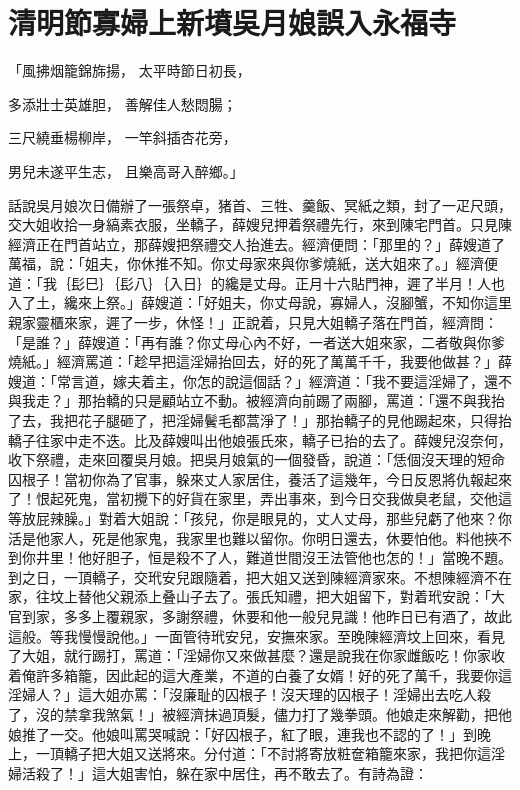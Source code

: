 %

\chapter{清明節寡婦上新墳\KG 吳月娘誤入永福寺}

「風拂烟籠錦旆揚，  太平時節日初長，

多添壯士英雄胆，  善解佳人愁悶腸；

三尺繞垂楊柳岸，  一竿斜插杏花旁，

男兒未遂平生志，  且樂高哥入醉鄉。」

話說吳月娘次日備辦了一張祭卓，猪首、三牲、羹飯、冥紙之類，封了一疋尺頭，交大姐收拾一身縞素衣服，坐轎子，薛嫂兒押着祭禮先行，來到陳宅門首。只見陳經濟正在門首站立，那薛嫂把祭禮交人抬進去。經濟便問：「那里的？」薛嫂道了萬福，說：「姐夫，你休推不知。你丈母家來與你爹燒紙，送大姐來了。」經濟便道：「我｛髟巳｝｛髟八｝｛入日｝的纔是丈母。正月十六貼門神，遲了半月！人也入了土，纔來上祭。」薛嫂道：「好姐夫，你丈母說，寡婦人，沒腳蟹，不知你這里親家靈櫃來家，遲了一步，休怪！」正說着，只見大姐轎子落在門首，經濟問：「是誰？」薛嫂道：「再有誰？你丈母心內不好，一者送大姐來家，二者敬與你爹燒紙。」經濟罵道：「趁早把這淫婦抬回去，好的死了萬萬千千，我要他做甚？」薛嫂道：「常言道，嫁夫着主，你怎的說這個話？」經濟道：「我不要這淫婦了，還不與我走？」那抬轎的只是顧站立不動。被經濟向前踢了兩腳，罵道：「還不與我抬了去，我把花子腿砸了，把淫婦鬢毛都蒿淨了！」那抬轎子的見他踢起來，只得抬轎子往家中走不迭。比及薛嫂叫出他娘張氏來，轎子已抬的去了。薛嫂兒沒奈何，收下祭禮，走來回覆吳月娘。把吳月娘氣的一個發昏，說道：「恁個沒天理的短命囚根子！當初你為了官事，躲來丈人家居住，養活了這幾年，今日反恩將仇報起來了！恨起死鬼，當初攪下的好貨在家里，弄出事來，到今日交我做臭老鼠，交他這等放屁辣臊。」對着大姐說：「孩兒，你是眼見的，丈人丈母，那些兒虧了他來？你活是他家人，死是他家鬼，我家里也難以留你。你明日還去，休要怕他。料他挾不到你井里！他好胆子，恒是殺不了人，難道世間沒王法管他也怎的！」當晚不題。到之日，一頂轎子，交玳安兒跟隨着，把大姐又送到陳經濟家來。不想陳經濟不在家，往坟上替他父親添上叠山子去了。張氏知禮，把大姐留下，對着玳安說：「大官到家，多多上覆親家，多謝祭禮，休要和他一般兒見識！他昨日已有酒了，故此這般。等我慢慢說他。」一面管待玳安兒，安撫來家。至晚陳經濟坟上回來，看見了大姐，就行踢打，罵道：「淫婦你又來做甚麼？還是說我在你家雌飯吃！你家收着俺許多箱籠，因此起的這大產業，不道的白養了女婿！好的死了萬千，我要你這淫婦人？」這大姐亦罵：「沒廉耻的囚根子！沒天理的囚根子！淫婦出去吃人殺了，沒的禁拿我煞氣！」被經濟抹過頂髮，儘力打了幾拳頭。他娘走來解勸，把他娘推了一交。他娘叫罵哭喊說：「好囚根子，紅了眼，連我也不認的了！」到晚上，一頂轎子把大姐又送將來。分付道：「不討將寄放粧奩箱籠來家，我把你這淫婦活殺了！」這大姐害怕，躲在家中居住，再不敢去了。有詩為證：

